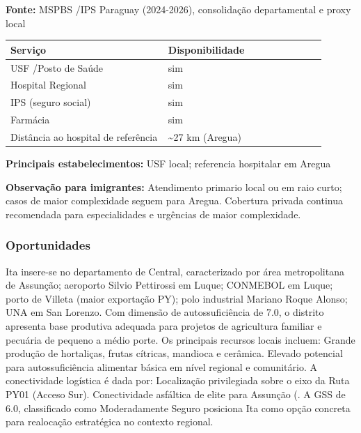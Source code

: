 \textbf{Fonte:} MSPBS /\allowbreak  IPS Paraguay (2024-2026), consolidação
departamental e proxy local

{\def\LTcaptype{none} %
\begin{longtable}{@{}>{\raggedright\arraybackslash}p{0.45\linewidth} >{\raggedright\arraybackslash}p{0.45\linewidth}@{}}
\toprule\noalign{}
Serviço & Disponibilidade \\
\midrule\noalign{}
\endhead
\bottomrule\noalign{}
\endlastfoot
USF /\allowbreak  Posto de Saúde & sim \\
Hospital Regional & sim \\
IPS (seguro social) & sim \\
Farmácia & sim \\
Distância ao hospital de referência & \textasciitilde27 km (Aregua) \\
\end{longtable}
}

\textbf{Principais estabelecimentos:} USF local; referencia hospitalar
em Aregua

\textbf{Observação para imigrantes:} Atendimento primario local ou em
raio curto; casos de maior complexidade seguem para Aregua. Cobertura
privada continua recomendada para especialidades e urgências de maior
complexidade.
\newpage

\subsubsection*{Oportunidades}\label{oport-ita-1105}
Ita insere-se no departamento de Central, caracterizado por área metropolitana de Assunção; aeroporto Silvio Pettirossi em Luque; CONMEBOL em Luque; porto de Villeta (maior exportação PY); polo industrial Mariano Roque Alonso; UNA em San Lorenzo. Com dimensão de autossuficiência de 7.0, o distrito apresenta base produtiva adequada para projetos de agricultura familiar e pecuária de pequeno a médio porte. Os principais recursos locais incluem: Grande produção de hortaliças, frutas cítricas, mandioca e cerâmica. Elevado potencial para autossuficiência alimentar básica em nível regional e comunitário. A conectividade logística é dada por: Localização privilegiada sobre o eixo da Ruta PY01 (Acceso Sur). Conectividade asfáltica de elite para Assunção (. A GSS de 6.0, classificado como Moderadamente Seguro posiciona Ita como opção concreta para realocação estratégica no contexto regional.

